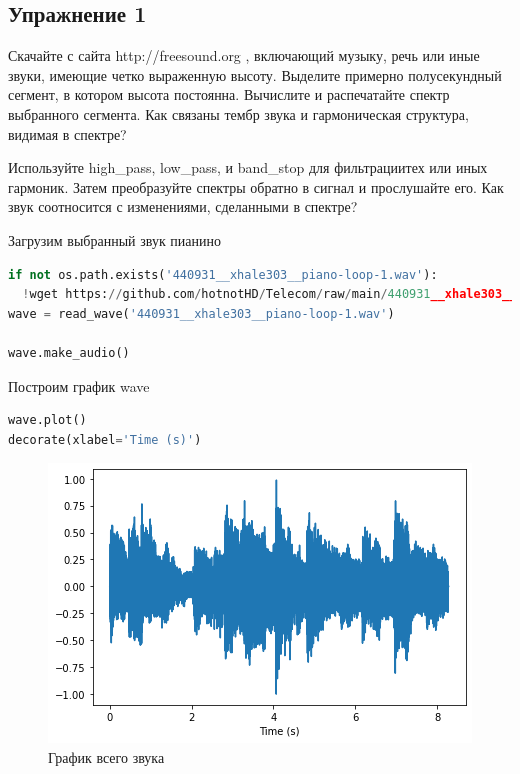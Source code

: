 \subsection{Упражнение 1}

Скачайте с сайта http://freesound.org , включающий музыку, речь или иные звуки, имеющие четко выраженную высоту. Выделите примерно полусекундный сегмент, в котором высота постоянна. Вычислите и распечатайте спектр выбранного сегмента. Как связаны тембр звука и гармоническая структура, видимая в спектре?


\noindent Используйте high\_pass, low\_pass, и band\_stop для фильтрациитех или иных гармоник. Затем преобразуйте спектры обратно в сигнал и прослушайте его. Как звук соотносится с изменениями, сделанными в спектре?
    

Загрузим выбранный звук пианино

\begin{lstlisting}[language=Python]
if not os.path.exists('440931__xhale303__piano-loop-1.wav'):
  !wget https://github.com/hotnotHD/Telecom/raw/main/440931__xhale303__piano-loop-1.wav
wave = read_wave('440931__xhale303__piano-loop-1.wav')

wave.make_audio()
\end{lstlisting}

Построим график wave
\begin{lstlisting}[language=Python]
wave.plot()
decorate(xlabel='Time (s)')
\end{lstlisting}

\begin{figure}[H]
	\begin{center}
		\includegraphics[scale=1]{fig/lab01/lab01_01.png}
		\caption{График всего звука}
	\end{center}
\end{figure}

